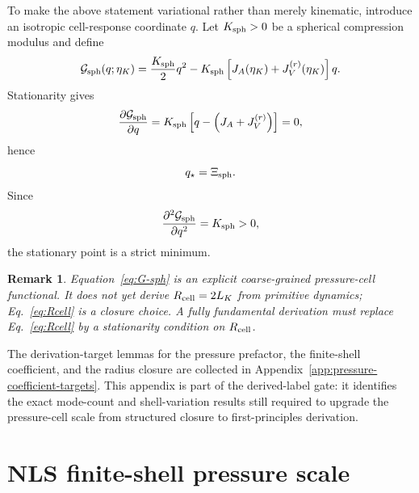 \documentclass[11pt]{article}
\newcommand{\Xisph}{\Xi_{\rm sph}}
\newtheorem{remark}{Remark}
\begin{document}
To make the above statement variational rather than merely kinematic, introduce an isotropic
cell-response coordinate \(q\).  Let \(K_{\rm sph}>0\) be a spherical compression modulus and
define
\begin{equation}
  \mathcal G_{\rm sph}(q;\eta_K)
  =
  \frac{K_{\rm sph}}{2}q^2
  -
  K_{\rm sph}\left[J_A(\eta_K)+J_V^{(r)}(\eta_K)\right]q.
  \label{eq:G-sph}
\end{equation}
Stationarity gives
\begin{equation}
  \frac{\partial\mathcal G_{\rm sph}}{\partial q}
  =
  K_{\rm sph}
  \left[
  q-\left(J_A+J_V^{(r)}\right)
  \right]
  =
  0,
\end{equation}
hence
\begin{equation}
  q_\star=\Xisph.
\end{equation}
Since
\begin{equation}
  \frac{\partial^2\mathcal G_{\rm sph}}{\partial q^2}=K_{\rm sph}>0,
\end{equation}
the stationary point is a strict minimum.

\begin{remark}
Equation~\eqref{eq:G-sph} is an explicit coarse-grained pressure-cell functional.  It does not
yet derive \(R_{\rm cell}=2L_K\) from primitive dynamics; Eq.~\eqref{eq:Rcell} is a closure
choice.  A fully fundamental derivation must replace Eq.~\eqref{eq:Rcell} by a stationarity
condition on \(R_{\rm cell}\).
\end{remark}


The derivation-target lemmas for the pressure prefactor, the finite-shell coefficient, and the radius closure are collected in Appendix~\ref{app:pressure-coefficient-targets}.  This appendix is part of the derived-label gate: it identifies the exact mode-count and shell-variation results still required to upgrade the pressure-cell scale from structured closure to first-principles derivation.

\section{NLS finite-shell pressure scale}
\label{sec:nls-shell}
\end{document}
